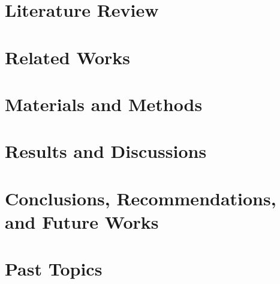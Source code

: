 \documentclass[tg, eng]{ita}    %
\begin{document}
\chapter{Literature Review}\label{chap:literature}


\chapter{Related Works}\label{chap:related}


%

\chapter{Materials and Methods}\label{chap:materials}


\chapter{Results and Discussions}\label{chap:results}


\chapter{Conclusions, Recommendations, and Future Works}\label{chap:conclusion}


%

\renewcommand\bibname{\itareferencesnamebabel} %


\setcounter{chapter}{0}

\appendix
\chapter{Past Topics}\label{apdx:past}

\end{document}
